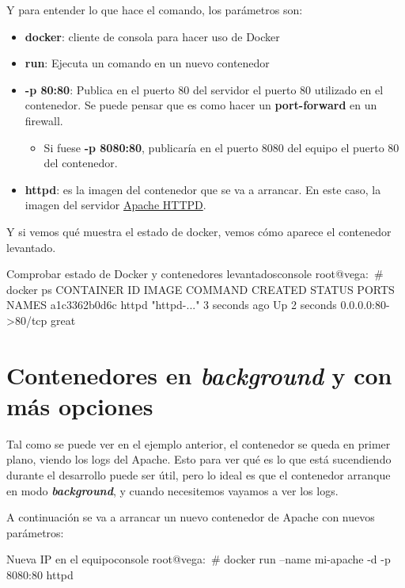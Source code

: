 Y para entender lo que hace el comando, los parámetros son:
\begin{itemize}
    \item \textbf{docker}: cliente de consola para hacer uso de Docker
    \item \textbf{run}: Ejecuta un comando en un nuevo contenedor
    \item \textbf{-p 80:80}: Publica en el puerto 80 del servidor el puerto 80 utilizado en el contenedor. Se puede pensar que es como hacer un \textbf{port-forward} en un firewall.
    \begin{itemize}
        \item Si fuese \textbf{-p 8080:80}, publicaría en el puerto 8080 del equipo el puerto 80 del contenedor.
    \end{itemize}
    \item \textbf{httpd}: es la imagen del contenedor que se va a arrancar. En este caso, la imagen del servidor \href{https://hub.docker.com/_/httpd}{Apache HTTPD}.
\end{itemize}

Y si vemos qué muestra el estado de docker, vemos cómo aparece el contenedor levantado.

\begin{mycode}{Comprobar estado de Docker y contenedores levantados}{console}{{\scriptsize }}
root@vega:~# docker ps
CONTAINER ID   IMAGE     COMMAND       CREATED         STATUS         PORTS               NAMES
a1c3362b0d6c   httpd     "httpd-..."   3 seconds ago   Up 2 seconds   0.0.0.0:80->80/tcp  great
\end{mycode}


\section{Contenedores en \textit{background} y con más opciones}
Tal como se puede ver en el ejemplo anterior, el contenedor se queda en primer plano, viendo los logs del Apache. Esto para ver qué es lo que está sucendiendo durante el desarrollo puede ser útil, pero lo ideal es que el contenedor arranque en modo \textbf{\textit{background}}, y cuando necesitemos vayamos a ver los logs.


A continuación se va a arrancar un nuevo contenedor de Apache con nuevos parámetros:
\begin{mycode}{Nueva IP en el equipo}{console}{}
root@vega:~# docker run --name mi-apache -d -p 8080:80 httpd
\end{mycode}

